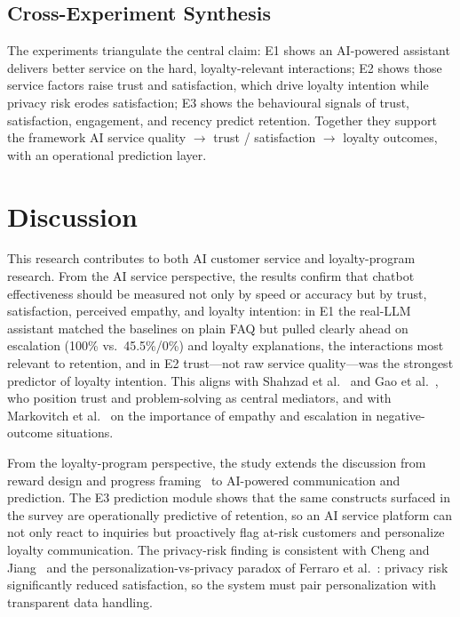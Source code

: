 \documentclass[runningheads]{llncs}
\begin{document}
\subsection{Cross-Experiment Synthesis}
The experiments triangulate the central claim: E1 shows an AI-powered assistant delivers better service on the hard, loyalty-relevant interactions; E2 shows those service factors raise trust and satisfaction, which drive loyalty intention while privacy risk erodes satisfaction; E3 shows the behavioural signals of trust, satisfaction, engagement, and recency predict retention. Together they support the framework AI service quality $\rightarrow$ trust / satisfaction $\rightarrow$ loyalty outcomes, with an operational prediction layer.

\section{Discussion}\label{sec:discussion}

This research contributes to both AI customer service and loyalty-program research. From the AI service perspective, the results confirm that chatbot effectiveness should be measured not only by speed or accuracy but by trust, satisfaction, perceived empathy, and loyalty intention: in E1 the real-LLM assistant matched the baselines on plain FAQ but pulled clearly ahead on escalation (100\% vs.\ 45.5\%/0\%) and loyalty explanations, the interactions most relevant to retention, and in E2 trust---not raw service quality---was the strongest predictor of loyalty intention. This aligns with Shahzad et al.~\cite{ref05} and Gao et al.~\cite{ref08}, who position trust and problem-solving as central mediators, and with Markovitch et al.~\cite{ref11} on the importance of empathy and escalation in negative-outcome situations.

From the loyalty-program perspective, the study extends the discussion from reward design and progress framing~\cite{ref09,ref10} to AI-powered communication and prediction. The E3 prediction module shows that the same constructs surfaced in the survey are operationally predictive of retention, so an AI service platform can not only react to inquiries but proactively flag at-risk customers and personalize loyalty communication. The privacy-risk finding is consistent with Cheng and Jiang~\cite{ref01} and the personalization-vs-privacy paradox of Ferraro et al.~\cite{ref07}: privacy risk significantly reduced satisfaction, so the system must pair personalization with transparent data handling.
\end{document}

